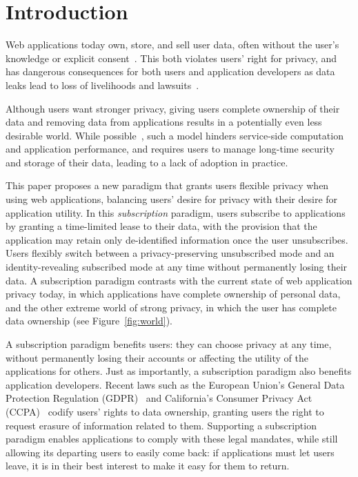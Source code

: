 \section{Introduction}

Web applications today own, store, and sell user data, often without the user's knowledge or
explicit consent~\cite{nytimes:fb, npr:data}. This both violates users' right for privacy, and has
dangerous consequences for both users and application developers as data leaks lead to loss of
livelihoods and lawsuits~\cite{breach:amazon,breach:twitter, breach:fb, breach:marriott,
breach:quora}. 

Although users want stronger privacy, giving users complete ownership of their data and removing
data from applications results in a potentially even less desirable world. While
possible~\cite{amber, w5, blockstack, bstore}, such a model hinders service-side computation
and application performance, and requires users to manage long-time security and storage of their
data, leading to a lack of adoption in practice.  

This paper proposes a new paradigm that grants users flexible privacy when using web applications,
balancing users' desire for privacy with their desire for application utility. In this
\emph{subscription} paradigm, users subscribe to applications by granting a time-limited lease to
their data, with the provision that the application may retain only de-identified information once
the user unsubscribes. Users flexibly switch between a privacy-preserving unsubscribed mode and an
identity-revealing subscribed mode at any time without permanently losing their data. A
subscription paradigm contrasts with the current state of web application privacy today, in which
applications have complete ownership of personal data, and the other extreme world of strong
privacy, in which the user has complete data ownership (see Figure~\ref{fig:world}). 

A subscription paradigm benefits users: they can choose privacy at any time, without
permanently losing their accounts or affecting the utility of the applications for others.  Just as
importantly, a subscription paradigm  also benefits application developers. Recent laws such as the
European Union's General Data Protection Regulation (GDPR)~\cite{eu:gdpr} and California's Consumer
Privacy Act (CCPA)~\cite{ca:privacy-act} codify users' rights to data ownership, granting users the
right to request erasure of information related to them. Supporting a subscription paradigm enables
applications to comply with these legal mandates, while still allowing its departing users to easily
come back: if applications must let users leave, it is in their best interest to make it easy for
them to return.  

